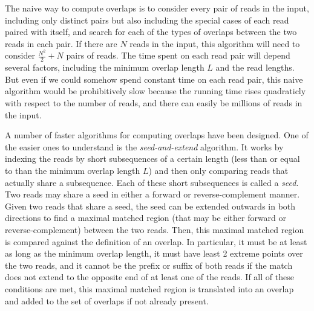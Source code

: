 \documentclass[10pt]{article}
\newcommand{\KeyTerm}[1]{{\it #1}}
\begin{document}
The naive way to compute overlaps is to consider every pair of reads in the
input, including only distinct pairs but also including the special cases of
each read paired with itself, and search for each of the types of overlaps
between the two reads in each pair.  If there are $N$ reads in the input, this
algorithm will need to consider $\frac{N^2}{2} + N$ pairs of reads. The time
spent on each read pair will depend several factors, including the minimum
overlap length $L$ and the read lengths.  But even if we could somehow spend
constant time on each read pair, this naive algorithm would be prohibitively
slow because the running time rises quadraticly with respect to the number of
reads, and there can easily be millions of reads in the input.

A number of faster algorithms for computing overlaps have been designed.  One of
the easier ones to understand is the \KeyTerm{seed-and-extend} algorithm.  It
works by indexing the reads by short subsequences of a certain length (less than
or equal to than the minimum overlap length $L$) and then only comparing reads
that actually share a subsequence.  Each of these short subsequences is called a
\KeyTerm{seed}.  Two reads may share a seed in either a forward or
reverse-complement manner.  Given two reads that share a seed, the seed can be
extended outwards in both directions to find a maximal matched region (that may
be either forward or reverse-complement) between the two reads.  Then, this
maximal matched region is compared against the definition of an overlap.  In
particular, it must be at least as long as the minimum overlap length, it must
have least 2 extreme points over the two reads, and it cannot be the prefix or
suffix of both reads if the match does not extend to the opposite end of at
least one of the reads.  If all of these conditions are met, this maximal matched
region is translated into an overlap and added to the set of overlaps if not
already present.
\end{document}
